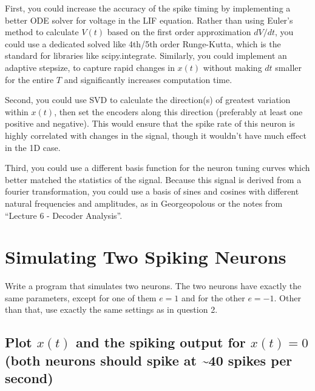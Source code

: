 \documentclass{article}
\begin{document}
First, you could increase the accuracy of the spike timing by
implementing a better ODE solver for voltage in the LIF equation. Rather
than using Euler's method to calculate $V(t)$ based on the first order
approximation $dV/dt$, you could use a dedicated solved like 4th/5th
order Runge-Kutta, which is the standard for libraries like
scipy.integrate. Similarly, you could implement an adaptive stepsize, to
capture rapid changes in $x(t)$ without making $dt$ smaller for the
entire $T$ and significantly increases computation time.

Second, you could use SVD to calculate the direction(s) of greatest
variation within $x(t)$, then set the encoders along this direction
(preferably at least one positive and negative). This would ensure that
the spike rate of this neuron is highly correlated with changes in the
signal, though it wouldn't have much effect in the 1D case.

Third, you could use a different basis function for the neuron tuning
curves which better matched the statistics of the signal. Because this
signal is derived from a fourier transformation, you could use a basis
of sines and cosines with different natural frequencies and amplitudes,
as in Georgeopolous or the notes from ``Lecture 6 - Decoder Analysis''.

\section{Simulating Two Spiking Neurons}\label{simulating-two-spiking-neurons}

Write a program that simulates two neurons. The two neurons have exactly
the same parameters, except for one of them $e=1$ and for the other
$e=-1$. Other than that, use exactly the same settings as in question 2.

\subsection{Plot $x(t)$ and the spiking output for $x(t)=0$ (both
neurons should spike at \textasciitilde{}40 spikes per
second)}\label{a-plot-xt-and-the-spiking-output-for-xt0-both-neurons-should-spike-at-40-spikes-per-second}
\end{document}
